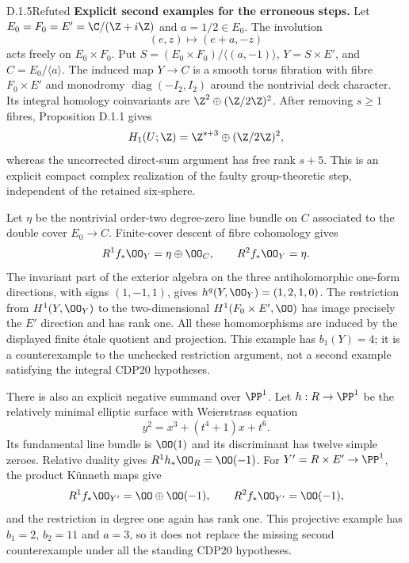 \begin{idstatement}{D.1.5}{Refuted}
\label{st:D.1.5}
\textbf{Explicit second examples for the erroneous steps.}
Let $E_0=F_0=E'=\C/(\Z+i\Z)$ and $a=1/2\in E_0$.
The involution
\[
(e,z)\longmapsto(e+a,-z)
\]
acts freely on $E_0\times F_0$. Put
$S=(E_0\times F_0)/\langle(a,-1)\rangle$,
$Y=S\times E'$, and $C=E_0/\langle a\rangle$.
The induced map $Y\to C$ is a smooth torus fibration with fibre
$F_0\times E'$ and monodromy
$\operatorname{diag}(-I_2,I_2)$ around the nontrivial deck character.
Its integral homology coinvariants are
$\Z^2\oplus(\Z/2\Z)^2$. After removing $s\geq1$ fibres,
Proposition D.1.1 gives
\[
H_1(U;\Z)=\Z^{s+3}\oplus(\Z/2\Z)^2,
\]
whereas the uncorrected direct-sum argument has free rank $s+5$.
This is an explicit compact complex realization of the faulty
group-theoretic step, independent of the retained six-sphere.

Let $\eta$ be the nontrivial order-two degree-zero line bundle on
$C$ associated to the double cover $E_0\to C$. Finite-cover descent
of fibre cohomology gives
\[
R^1f_*\OO_Y=\eta\oplus\OO_C,\qquad R^2f_*\OO_Y=\eta.
\]
The invariant part of the exterior algebra on the three
antiholomorphic one-form directions, with signs $(1,-1,1)$,
gives $h^q(Y,\OO_Y)=(1,2,1,0)$. The restriction from
$H^1(Y,\OO_Y)$ to the two-dimensional $H^1(F_0\times E',\OO)$
has image precisely the $E'$ direction and has rank one.
All these homomorphisms are induced by the displayed finite
\'etale quotient and projection. This example has $b_1(Y)=4$;
it is a counterexample to the unchecked restriction argument, not
a second example satisfying the integral CDP20 hypotheses.

There is also an explicit negative summand over $\PP^1$. Let
$h:R\to\PP^1$ be the relatively minimal elliptic surface with
Weierstrass equation
\[
y^2=x^3+(t^4+1)x+t^6.
\]
Its fundamental line bundle is $\OO(1)$ and its discriminant has
twelve simple zeroes. Relative duality gives
$R^1h_*\OO_R=\OO(-1)$. For $Y'=R\times E'\to\PP^1$,
the product K\"unneth maps give
\[
R^1f_*\OO_{Y'}=\OO\oplus\OO(-1),\qquad
R^2f_*\OO_{Y'}=\OO(-1),
\]
and the restriction in degree one again has rank one. This
projective example has $b_1=2$, $b_2=11$ and $a=3$, so it does not
replace the missing second counterexample under all the standing
CDP20 hypotheses.
\end{idstatement}



